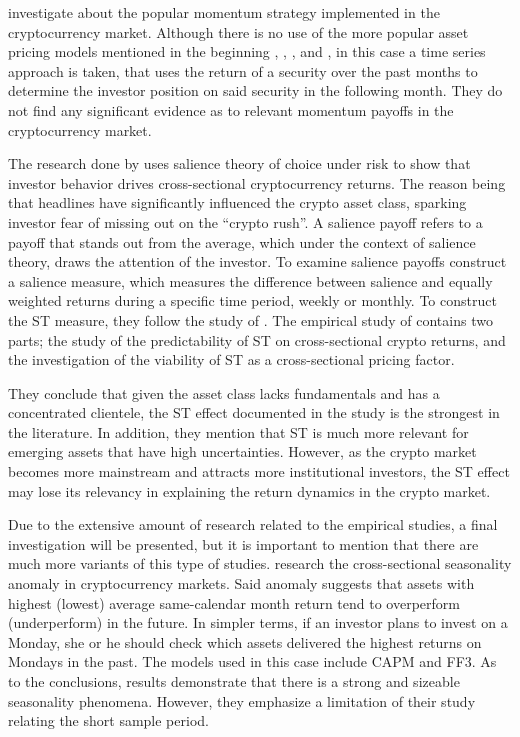 \parencite{GROBYS20196} investigate about the popular momentum strategy implemented in the cryptocurrency market. Although there is no use of the more popular asset pricing models mentioned in the beginning \parencite{sharpe1964}, \parencite{fama1993}, \parencite{fama2015}, and \parencite{carhart1997}, in this case a time series approach is taken, that uses the return of a security over the past months to determine the investor position on said security in the following month. They do not find any significant evidence as to relevant momentum payoffs in the cryptocurrency market.

The research done by \parencite{CAI2024107052} uses salience theory of choice under risk to show that investor behavior drives cross-sectional cryptocurrency returns. The reason being that headlines have significantly influenced the crypto asset class, sparking investor fear of missing out on the ``crypto rush''. A salience payoff refers to a payoff that stands out from the average, which under the context of salience theory, draws the attention of the investor. To examine salience payoffs \parencite{CAI2024107052} construct a salience measure, which measures the difference between salience and equally weighted returns during a specific time period, weekly or monthly. To construct the ST measure, they follow the study of \parencite{COSEMANS2021460}. The empirical study of \parencite{CAI2024107052} contains two parts; the study of the predictability of ST on cross-sectional crypto returns, and the investigation of the viability of ST as a cross-sectional pricing factor. 

They conclude that given the asset class lacks fundamentals and has a concentrated clientele, the ST effect documented in the study is the strongest in the literature. In addition, they mention that ST is much more relevant for emerging assets that have high uncertainties. However, as the crypto market becomes more mainstream and attracts more institutional investors, the ST effect may lose its relevancy in explaining the return dynamics in the crypto market.  

Due to the extensive amount of research related to the empirical studies, a final investigation will be presented, but it is important to mention that there are much more variants of this type of studies. \parencite{Long2020} research the cross-sectional seasonality anomaly in cryptocurrency markets. Said anomaly suggests that assets with highest (lowest) average same-calendar month return tend to overperform (underperform) in the future. In simpler terms, if an investor plans to invest on a Monday, she or he should check which assets delivered the highest returns on Mondays in the past. The models used in this case include CAPM and FF3. As to the conclusions, results demonstrate that there is a strong and sizeable seasonality phenomena. However, they emphasize a limitation of their study relating the short sample period.

